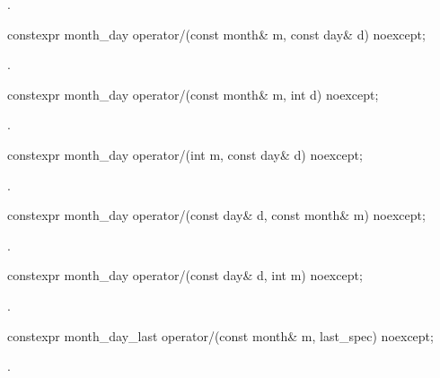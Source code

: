\begin{itemdescr}
\pnum
\returns
{}.
\end{itemdescr}

\begin{itemdecl}
constexpr month_day
  operator/(const month& m, const day& d) noexcept;
\end{itemdecl}

\begin{itemdescr}
\pnum
\returns
{}.
\end{itemdescr}

\begin{itemdecl}
constexpr month_day
  operator/(const month& m, int d) noexcept;
\end{itemdecl}

\begin{itemdescr}
\pnum
\returns
{}.
\end{itemdescr}

\begin{itemdecl}
constexpr month_day
  operator/(int m, const day& d) noexcept;
\end{itemdecl}

\begin{itemdescr}
\pnum
\returns
{}.
\end{itemdescr}

\begin{itemdecl}
constexpr month_day
  operator/(const day& d, const month& m) noexcept;
\end{itemdecl}

\begin{itemdescr}
\pnum
\returns
{}.
\end{itemdescr}

\begin{itemdecl}
constexpr month_day
  operator/(const day& d, int m) noexcept;
\end{itemdecl}

\begin{itemdescr}
\pnum
\returns
{}.
\end{itemdescr}

\begin{itemdecl}
constexpr month_day_last
  operator/(const month& m, last_spec) noexcept;
\end{itemdecl}

\begin{itemdescr}
\pnum
\returns
{}.
\end{itemdescr}

